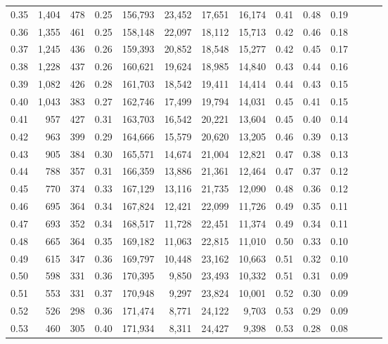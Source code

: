\begin{tabular}{rrrrrrrrrrrrrr}
0.35 &   1,404 &  478 &  0.25 &  156,793 &   23,452 &  17,651 &  16,174 &  0.41 &  0.48 &      0.19 \\
0.36 &   1,355 &  461 &  0.25 &  158,148 &   22,097 &  18,112 &  15,713 &  0.42 &  0.46 &      0.18 \\
0.37 &   1,245 &  436 &  0.26 &  159,393 &   20,852 &  18,548 &  15,277 &  0.42 &  0.45 &      0.17 \\
0.38 &   1,228 &  437 &  0.26 &  160,621 &   19,624 &  18,985 &  14,840 &  0.43 &  0.44 &      0.16 \\
0.39 &   1,082 &  426 &  0.28 &  161,703 &   18,542 &  19,411 &  14,414 &  0.44 &  0.43 &      0.15 \\
0.40 &   1,043 &  383 &  0.27 &  162,746 &   17,499 &  19,794 &  14,031 &  0.45 &  0.41 &      0.15 \\
0.41 &     957 &  427 &  0.31 &  163,703 &   16,542 &  20,221 &  13,604 &  0.45 &  0.40 &      0.14 \\
0.42 &     963 &  399 &  0.29 &  164,666 &   15,579 &  20,620 &  13,205 &  0.46 &  0.39 &      0.13 \\
0.43 &     905 &  384 &  0.30 &  165,571 &   14,674 &  21,004 &  12,821 &  0.47 &  0.38 &      0.13 \\
0.44 &     788 &  357 &  0.31 &  166,359 &   13,886 &  21,361 &  12,464 &  0.47 &  0.37 &      0.12 \\
0.45 &     770 &  374 &  0.33 &  167,129 &   13,116 &  21,735 &  12,090 &  0.48 &  0.36 &      0.12 \\
0.46 &     695 &  364 &  0.34 &  167,824 &   12,421 &  22,099 &  11,726 &  0.49 &  0.35 &      0.11 \\
0.47 &     693 &  352 &  0.34 &  168,517 &   11,728 &  22,451 &  11,374 &  0.49 &  0.34 &      0.11 \\
0.48 &     665 &  364 &  0.35 &  169,182 &   11,063 &  22,815 &  11,010 &  0.50 &  0.33 &      0.10 \\
0.49 &     615 &  347 &  0.36 &  169,797 &   10,448 &  23,162 &  10,663 &  0.51 &  0.32 &      0.10 \\
0.50 &     598 &  331 &  0.36 &  170,395 &    9,850 &  23,493 &  10,332 &  0.51 &  0.31 &      0.09 \\
0.51 &     553 &  331 &  0.37 &  170,948 &    9,297 &  23,824 &  10,001 &  0.52 &  0.30 &      0.09 \\
0.52 &     526 &  298 &  0.36 &  171,474 &    8,771 &  24,122 &   9,703 &  0.53 &  0.29 &      0.09 \\
0.53 &     460 &  305 &  0.40 &  171,934 &    8,311 &  24,427 &   9,398 &  0.53 &  0.28 &      0.08 \\

\end{tabular}
